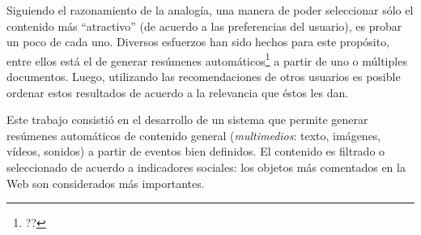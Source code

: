 \documentclass[upright, contnum]{umemoria}
\begin{document}
Siguiendo el razonamiento de la analogía, una manera de poder
seleccionar sólo el contenido más ``atractivo'' (de acuerdo a las
preferencias del usuario), es probar un poco de cada uno. Diversos
esfuerzos han sido hechos para este propósito, entre ellos está el de
generar resúmenes automáticos\footnote{?? } a partir de uno o múltiples
documentos. Luego, utilizando las recomendaciones de otros usuarios es
posible ordenar estos resultados de acuerdo a la relevancia que éstos
les dan.

Este trabajo consistió en el desarrollo de un sistema que permite
generar resúmenes automáticos de contenido general (\emph{multimedios}:
texto, imágenes, vídeos, sonidos) a partir de eventos bien
definidos. El contenido es filtrado o seleccionado de acuerdo a
indicadores sociales: los objetos más comentados en la Web son
considerados más importantes.
\end{document}
